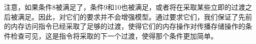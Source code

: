 \begin{commentary}
  注意，如果条件8被满足了，条件9和10也被满足，或者将在采取某些立即的过渡之后被满足。因此，对它们的要求并不会增强模型。通过要求它们，我们保证了先前的内存访问指令已经采取了足够的过渡，使得它们的内存操作对传播存储操作的条件检查可见，这是指令将采取的下一个过渡，使得那个条件更加简单。
\end{commentary}


